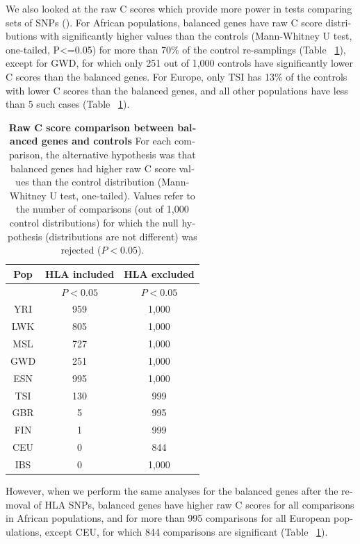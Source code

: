 \begin{refsection}
\begin{otherlanguage}{english}
We also looked at the raw C scores which provide more power in tests comparing sets of SNPs (\cite{Kircher2014}). For African populations, balanced genes have raw C score distributions with significantly higher values than the controls (Mann-Whitney U test, one-tailed, P<=0.05) for more than 70\% of the control re-samplings (Table ~\ref{tab:rawC}), except for GWD, for which only 251 out of 1,000 controls  have significantly lower C scores than the balanced genes. For Europe, only TSI has 13\% of the controls with lower C scores than the balanced genes, and all other populations have less than 5 such cases (Table ~\ref{tab:rawC}). 

\begin{table}[h]
\centering
\begin{tabular}{@{}ccc@{}}
\toprule
\rowcolor[HTML]{C0C0C0} 
{\color[HTML]{000000} Pop} & {\color[HTML]{000000} HLA included} & HLA excluded \\ \midrule
 & $P<0.05$ & \multicolumn{1}{c}{$P<0.05$} \\
YRI & 959 &  1,000 \\
LWK & 805 &  1,000 \\
MSL & 727 &  1,000 \\
GWD & 251 &  1,000 \\
ESN & 995 &  1,000 \\
TSI & 130 &  999 \\
GBR & 5 &  995 \\
FIN & 1 &  999 \\
CEU & 0 & 844 \\
IBS & 0 &  1,000\\ \bottomrule
\end{tabular}
\caption{\textbf{Raw C score comparison between balanced genes and controls}
For each comparison, the alternative hypothesis was that balanced genes had higher raw C score values than the control distribution (Mann-Whitney U test, one-tailed). Values refer to the number of comparisons (out of 1,000 control distributions) for which the null hypothesis (distributions are not different) was rejected ($P<0.05$).
}
\label{tab:rawC}
\end{table}

However, when we perform the same analyses for the balanced genes after the removal of HLA SNPs, balanced genes have higher raw C scores for all comparisons in African populations, and for more than 995 comparisons for all European populations, except CEU, for which 844 comparisons are significant (Table ~\ref{tab:rawC}).



\end{otherlanguage}
\end{refsection}
